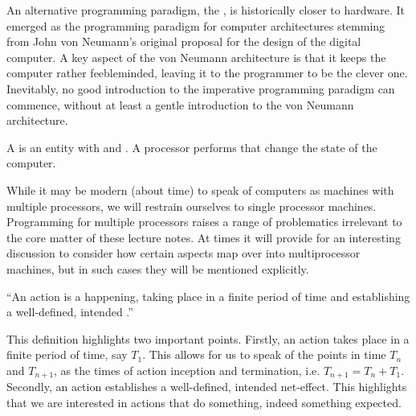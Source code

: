 
An alternative programming paradigm, the , is historically
closer to hardware. It emerged as the programming paradigm for computer
architectures stemming from John von Neumann's original proposal for the design
of the digital computer\cite{von-neumann}.  A key aspect of the von Neumann
architecture is that it keeps the computer rather feebleminded, leaving it to
the programmer to be the clever one. Inevitably, no good introduction to the
imperative programming paradigm can commence, without at least a gentle
introduction to the von Neumann architecture.

\begin{definition}

A \footnotemark is an entity with  and
. A processor performs  that change the state of
the computer.


\end{definition}

While it may be modern (about time) to speak of computers as machines with
multiple processors, we will restrain ourselves to single processor machines.
Programming for multiple processors raises a range of problematics irrelevant
to the core matter of these lecture notes. At times it will provide for an
interesting discussion to consider how certain aspects map over into
multiprocessor machines, but in such cases they will be mentioned explicitly.

\begin{definition}

``An action is a happening, taking place in a finite period of time and
establishing a well-defined, intended .''
\cite{dijkstra-introduction}

\end{definition}

This definition highlights two important points. Firstly, an action takes place
in a finite period of time, say $T_1$. This allows for us to speak of the
points in time $T_n$ and $T_{n+1}$, as the times of action inception and
termination, i.e. $T_{n+1}=T_n+T_1$. Secondly, an action establishes a
well-defined, intended net-effect. This highlights that we are interested in
actions that do something, indeed something expected.


